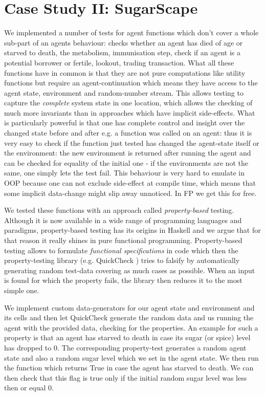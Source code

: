 \section{Case Study II: SugarScape}
\label{sec:case_sug}

We implemented a number of tests for agent functions which don't cover a whole sub-part of an agents behaviour: checks whether an agent has died of age or starved to death, the metabolism, immunisation step, check if an agent is a potential borrower or fertile, lookout, trading transaction. What all these functions have in common is that they are not pure computations like utility functions but require an agent-continuation which means they have access to the agent state, environment and random-number stream. This allows testing to capture the \textit{complete} system state in one location, which allows the checking of much more invariants than in approaches which have implicit side-effects.
What is particularly powerful is that one has complete control and insight over the changed state before and after e.g. a function was called on an agent: thus it is very easy to check if the function just tested has changed the agent-state itself or the environment: the new environment is returned after running the agent and can be checked for equality of the initial one - if the environments are not the same, one simply lets the test fail. This behaviour is very hard to emulate in OOP because one can not exclude side-effect at compile time, which means that some implicit data-change might slip away unnoticed. In FP we get this for free.

We tested these functions with an approach called \textit{property-based} testing. Although it is now available in a wide range of programming languages and paradigms, property-based testing has its origins in Haskell \cite{claessen_quickcheck_2000,claessen_testing_2002} and we argue that for that reason it really shines in pure functional programming. Property-based testing allows to formulate \textit{functional specifications} in code which then the property-testing library (e.g. QuickCheck \cite{claessen_quickcheck_2000}) tries to falsify by automatically generating random test-data covering as much cases as possible. When an input is found for which the property fails, the library then reduces it to the most simple one. %

We implement custom data-generators for our agent state and environment and its cells and then let QuickCheck generate the random data and us running the agent with the provided data, checking for the properties. An example for such a property is that an agent has starved to death in case its sugar (or spice) level has dropped to 0. The corresponding property-test generates a random agent state and also a random sugar level which we set in the agent state. We then run the function which returns True in case the agent has starved to death. We can then check that this flag is true only if the initial random sugar level was less then or equal 0.

